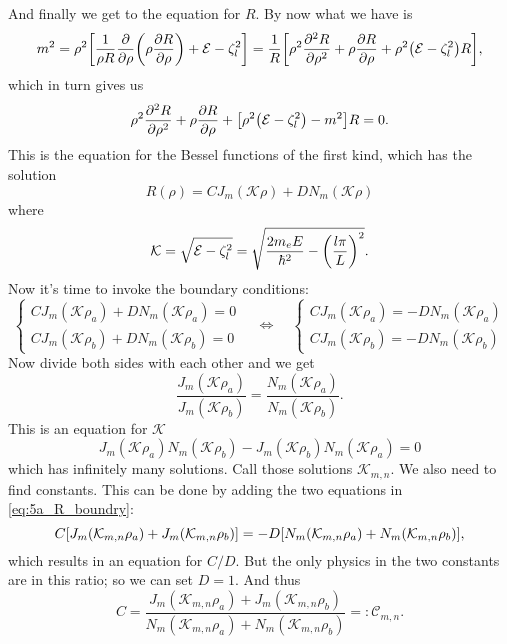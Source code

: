\documentclass[11pt,letter, swedish, english
]{article}
\begin{document}
And finally we get to the equation for $R$. By now what we have is
\begin{equation}
m^2=\rho^2\qty[\frac{1}{\rho R}\pdv{\rho}
\qty(\rho\pdv{R}{\rho})+\mathcal{E}-\zeta_l^2]
=\frac{1}{R}\qty[\rho^2\pdv[2]{R}{\rho}
+\rho\pdv{R}{\rho}+\rho^2\qty(\mathcal{E}-\zeta_l^2)R],
\end{equation}
which in turn gives us
\begin{equation}\label{eq:5a_Bessel}
\rho^2\pdv[2]{R}{\rho}
+\rho\pdv{R}{\rho}+\qty[\rho^2\qty(\mathcal{E}-\zeta_l^2)-m^2]R=0.
\end{equation}
This is the equation for the Bessel functions of the first kind, which
has the solution
\begin{equation}
R(\rho)=CJ_m(\mathcal{K}\rho)+DN_m(\mathcal{K}\rho)
\end{equation}
where
\begin{equation}\label{eq:5a_kappa}
\mathcal{K}=%
\sqrt{\E-\zeta_l^2}=\sqrt{\frac{2m_eE}{\hbar^2}-\qty(\frac{l\pi}{L})^2}.
\end{equation}
Now it's time to invoke the boundary conditions:
\begin{equation}\label{eq:5a_R_boundry}
\begin{cases}
CJ_m(\mathcal{K}\rho_a)+DN_m(\mathcal{K}\rho_a)=0\\
CJ_m(\mathcal{K}\rho_b)+DN_m(\mathcal{K}\rho_b)=0
\end{cases}
\quad\Longleftrightarrow\quad
\begin{cases}
CJ_m(\mathcal{K}\rho_a)=-DN_m(\mathcal{K}\rho_a)\\
CJ_m(\mathcal{K}\rho_b)=-DN_m(\mathcal{K}\rho_b)
\end{cases}
\end{equation}
Now divide both sides with each other and we get
\begin{equation}
\frac{J_m(\mathcal{K}\rho_a)}{J_m(\mathcal{K}\rho_b)}=
\frac{N_m(\mathcal{K}\rho_a)}{N_m(\mathcal{K}\rho_b)}.
\end{equation}
This is an equation for $\mathcal{K}$
\begin{equation}\label{eq:5a_K}
J_m(\mathcal{K}\rho_a)N_m(\mathcal{K}\rho_b)-J_m(\mathcal{K}\rho_b)N_m(\mathcal{K}\rho_a)=0
\end{equation}
which has infinitely many solutions. Call those solutions
$\mathcal{K}_{m,n}$. We also need to find constants. This can be done
by adding the two equations in \eqref{eq:5a_R_boundry}:
\begin{equation}
C\qty[J_m(\mathcal{K}_{m,n}\rho_a)+J_m(\mathcal{K}_{m,n}\rho_b)]
=-D\qty[N_m(\mathcal{K}_{m,n}\rho_a)+N_m(\mathcal{K}_{m,n}\rho_b)],
\end{equation}
which results in an equation for $C/D$. But the only physics in the
two constants are in this ratio; so we can set $D=1$. And thus
\begin{equation}\label{eq:5a_C}
C=
\frac{J_m(\mathcal{K}_{m,n}\rho_a)+J_m(\mathcal{K}_{m,n}\rho_b)}
{N_m(\mathcal{K}_{m,n}\rho_a)+N_m(\mathcal{K}_{m,n}\rho_b)}
=:\mathcal{C}_{m,n}.
\end{equation}
\end{document}
